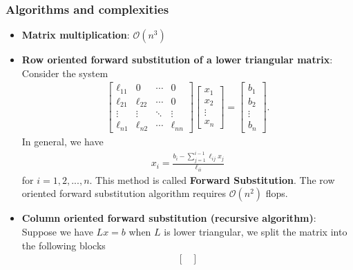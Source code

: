 \documentclass{report}
\begin{document}
    \pagebreak \bigbreak \noindent 
    \subsubsection{Algorithms and complexities}
    \begin{itemize}
        \item \textbf{Matrix multiplication}: $\mathcal{O}(n^{3}) $
        \item \textbf{Row oriented forward substitution of a lower triangular matrix}:
            Consider the system
            \begin{align*}
                \begin{bmatrix}
                    \ell_{11} & 0 & \cdots & 0 \\
                    \ell_{21} & \ell_{22} & \cdots & 0 \\
                    \vdots & \vdots & \ddots & \vdots \\
                    \ell_{n1} & \ell_{n2} & \cdots & \ell_{nn}
                    \end{bmatrix} \begin{bmatrix}
                    x_{1} \\ x_{2} \\ \vdots \\ x_{n}
                \end{bmatrix}
                =
                \begin{bmatrix}
                    b_{1} \\ b_{2} \\ \vdots \\ b_{n}
                \end{bmatrix}
            .\end{align*}
            In general, we have
            \begin{align*}
                x_{i} = \frac{b_{i} - \sum_{j=1}^{i-1}\ell_{ij}x_{j}}{\ell_{ii}}
            \end{align*}
            for $i =1,2,...,n $. This method is called \textbf{Forward Substitution}.
            \bigbreak \noindent 
            The row oriented forward substitution algorithm requires $\mathcal{O}(n^{2})$ flops.
        \item \textbf{Column oriented forward substitution (recursive algorithm)}: 
            Suppose we have $Lx = b$ when $L$ is lower triangular, we split the matrix into the following blocks
            \begin{align*}
                \begin{bmatrix}

\end{bmatrix}
\end{align*}
\end{itemize}
\end{document}
